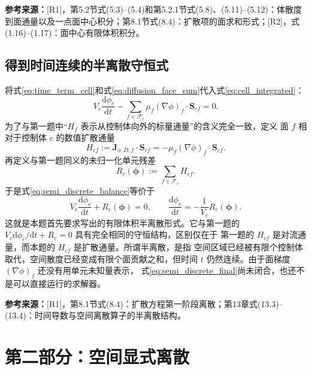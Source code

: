 \documentclass[UTF8,12pt,a4paper]{ctexart}
\numberwithin{equation}{section}
\newcommand{\Rone}{\textnormal{[R1]}}
\newcommand{\Rtwo}{\textnormal{[R2]}}
\newcommand{\source}[1]{%
  \par\smallskip
  \noindent\colorbox{sourcebg}{%
    \parbox{0.955\linewidth}{\raggedright\footnotesize\color{sourcegray}\textbf{参考来源：}#1}%
  }
  \par\smallskip
}
\newcommand{\Sf}{\bm S}
\begin{document}
\source{\Rone，第5.2节式(5.3)--(5.4)和第5.2.1节式(5.8)、(5.11)--(5.12)：体散度到面通量以及一点面中心积分；第8.1节式(8.4)：扩散项的面求和形式；\Rtwo，式(1.16)--(1.17)：面中心有限体积积分。}

\subsection{得到时间连续的半离散守恒式}

将式\eqref{eq:time_term_cell}和式\eqref{eq:diffusion_face_sum}代入式\eqref{eq:cell_integrated}：
\begin{equation}
  V_c\frac{\mathrm d\phi_c}{\mathrm dt}
  -\sum_{f\in\mathcal F_c}
  \mu_f(\nabla\phi)_f\cdot\Sf_{cf}=0.
  \label{eq:semi_discrete_balance}
\end{equation}
为了与第一题中“$H_f$ 表示从控制体向外的标量通量”的含义完全一致，定义
面 $f$ 相对于控制体 $c$ 的数值扩散通量
\begin{equation}
  \boxed{
  H_{cf}:=\bm J_{\phi,D,f}\cdot\Sf_{cf}
  =-\mu_f(\nabla\phi)_f\cdot\Sf_{cf}}.
  \label{eq:diffusive_numerical_flux}
\end{equation}
再定义与第一题同义的未归一化单元残差
\begin{equation}
  \boxed{
  R_c(\bm\phi):=\sum_{f\in\mathcal F_c}H_{cf}}.
  \label{eq:diffusive_residual}
\end{equation}
于是式\eqref{eq:semi_discrete_balance}等价于
\begin{equation}
  \boxed{
  V_c\frac{\mathrm d\phi_c}{\mathrm dt}
  +R_c(\bm\phi)=0,
  \qquad
  \frac{\mathrm d\phi_c}{\mathrm dt}
  =-\frac{1}{V_c}R_c(\bm\phi)}.
  \label{eq:semi_discrete_final}
\end{equation}
这就是本题首先要求写出的有限体积半离散形式。它与第一题的
$V_c\mathrm d\phi_c/\mathrm dt+R_c=0$ 具有完全相同的守恒结构，区别仅在于
第一题的 $H_{cf}$ 是对流通量，而本题的 $H_{cf}$ 是扩散通量。所谓半离散，是指
空间区域已经被有限个控制体取代，空间散度已经变成有限个面贡献之和，但时间
$t$ 仍然连续。由于面梯度 $(\nabla\phi)_f$ 还没有用单元未知量表示，
式\eqref{eq:semi_discrete_final}尚未闭合，也还不是可以直接运行的求解器。

\source{\Rone，第8.1节式(8.4)：扩散方程第一阶段离散；第13章式(13.3)--(13.4)：时间导数与空间离散算子的半离散结构。}

\newpage
\section{第二部分：空间显式离散}
\end{document}
